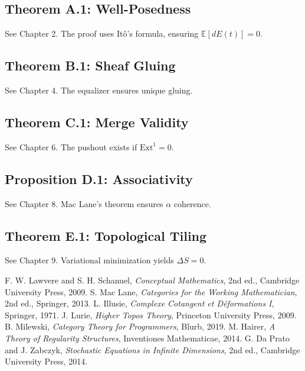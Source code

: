 \documentclass[12pt]{article}
\begin{document}
\subsection{Theorem A.1: Well-Posedness}
See Chapter 2. The proof uses Itô’s formula, ensuring $\mathbb{E}[dE(t)] = 0$.

\subsection{Theorem B.1: Sheaf Gluing}
See Chapter 4. The equalizer ensures unique gluing.

\subsection{Theorem C.1: Merge Validity}
See Chapter 6. The pushout exists if $\mathrm{Ext}^1 = 0$.

\subsection{Proposition D.1: Associativity}
See Chapter 8. Mac Lane’s theorem ensures $\alpha$ coherence.

\subsection{Theorem E.1: Topological Tiling}
See Chapter 9. Variational minimization yields $\Delta S = 0$.

\begin{center}
\end{center}


\begin{thebibliography}{7}
F. W. Lawvere and S. H. Schanuel, \emph{Conceptual Mathematics}, 2nd ed., Cambridge University Press, 2009.
S. Mac Lane, \emph{Categories for the Working Mathematician}, 2nd ed., Springer, 2013.
L. Illusie, \emph{Complexe Cotangent et Déformations I}, Springer, 1971.
J. Lurie, \emph{Higher Topos Theory}, Princeton University Press, 2009.
B. Milewski, \emph{Category Theory for Programmers}, Blurb, 2019.
M. Hairer, \emph{A Theory of Regularity Structures}, Inventiones Mathematicae, 2014.
G. Da Prato and J. Zabczyk, \emph{Stochastic Equations in Infinite Dimensions}, 2nd ed., Cambridge University Press, 2014.
\end{thebibliography}
\end{document}
